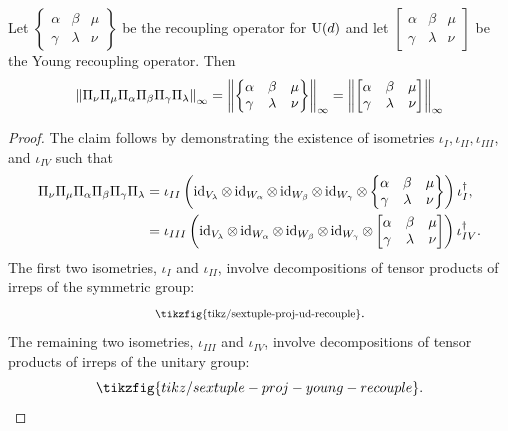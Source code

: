 \documentclass[notitlepage, 10pt]{article}
\begin{document}
\begin{lem}
    Let $\begin{Bmatrix} \alpha & \beta & \mu \\ \gamma & \lambda & \nu \end{Bmatrix}$ be the recoupling operator for $\operatorname{U}(d)$ and let $\begin{bmatrix} \alpha & \beta & \mu \\ \gamma & \lambda & \nu \end{bmatrix}$ be the Young recoupling operator. 
    Then
    \begin{equation}
        \label{eq:recoupling_prod_proj_iso_norm}
        \left\lVert\Pi_{\nu}\Pi_{\mu}\Pi_{\alpha}\Pi_{\beta}\Pi_{\gamma}\Pi_{\lambda}\right\rVert_{\infty}
        =\left\lVert\begin{Bmatrix} \alpha & \beta & \mu \\ \gamma & \lambda & \nu \end{Bmatrix}\right\rVert_{\infty}
        =\left\lVert\begin{bmatrix} \alpha & \beta & \mu \\ \gamma & \lambda & \nu \end{bmatrix}\right\rVert_{\infty}
    \end{equation}
\end{lem}
\begin{proof}
    The claim follows by demonstrating the existence of isometries $\iota_{I}, \iota_{II}, \iota_{III}$, and $\iota_{IV}$ such that
    \begin{align}
        \label{eq:recoupling_prod_proj_iso}
        \Pi_{\nu}\Pi_{\mu}\Pi_{\alpha}\Pi_{\beta}\Pi_{\gamma}\Pi_{\lambda} 
        &= \iota_{II} \left(\operatorname{id}_{V_{\lambda}} \otimes \operatorname{id}_{W_{\alpha}} \otimes \operatorname{id}_{W_{\beta}} \otimes \operatorname{id}_{W_{\gamma}} \otimes \begin{Bmatrix} \alpha & \beta & \mu \\ \gamma & \lambda & \nu \end{Bmatrix}\right) \iota_{I}^{\dagger}, \\
        &= \iota_{III} \left(\operatorname{id}_{V_{\lambda}} \otimes \operatorname{id}_{W_{\alpha}} \otimes \operatorname{id}_{W_{\beta}} \otimes \operatorname{id}_{W_{\gamma}} \otimes \begin{bmatrix} \alpha & \beta & \mu \\ \gamma & \lambda & \nu \end{bmatrix}\right) \iota_{IV}^{\dagger}.
    \end{align}
    The first two isometries, $\iota_{I}$ and $\iota_{II}$, involve decompositions of tensor products of irreps of the symmetric group:
    \begin{equation}
        \scalebox{0.8}{\tikzfig{tikz/sextuple-proj-ud-recouple}}.
    \end{equation}
    The remaining two isometries, $\iota_{III}$ and $\iota_{IV}$, involve decompositions of tensor products of irreps of the unitary group:
    \begin{equation}
        \tikzfig{tikz/sextuple-proj-young-recouple}.
    \end{equation}
\end{proof}
\end{document}
